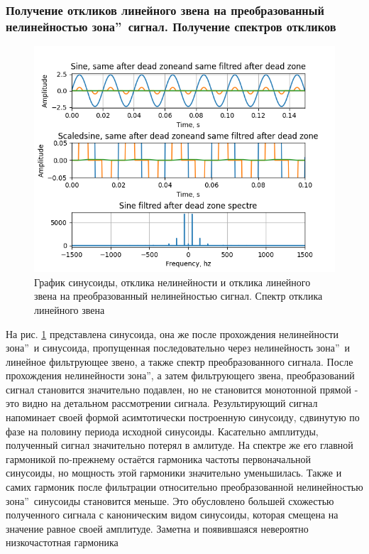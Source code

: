 \subsubsection{Получение откликов линейного звена на преобразованный
нелинейностью  зона\textquotedblright\ сигнал.
Получение спектров откликов}

\begin{figure}[H]
	\centering
	\includegraphics[width=0.95\linewidth]{body/images/sine-after-filtred-dead-zone-and-its-spectre.png}
	\caption{График синусоиды, отклика нелинейности и отклика линейного звена на преобразованный
	нелинейностью сигнал. Спектр отклика линейного звена}
	\label{fig:25}
\end{figure}

На рис. \ref{fig:25} представлена синусоида, она же после прохождения
нелинейности  зона\textquotedblright\ и синусоида,
пропущенная последовательно через нелинейность  зона\textquotedblright\
и линейное фильтрующее звено, а также спектр преобразованного сигнала.
После прохождения нелинейности \textquotedblleftМёртвая зона\textquotedblright, а
затем фильтрующего звена, преобразований сигнал становится значительно подавлен,
но не становится монотонной прямой - это видно на детальном рассмотрении сигнала.
Результирующий сигнал напоминает своей формой асимтотически построенную синусоиду,
сдвинутую по фазе на половину периода исходной синусоиды. Касательно амплитуды,
полученный сигнал значительно потерял в амлитуде. На спектре же его главной
гармоникой по-прежнему остаётся гармоника частоты первоначальной синусоиды,
но мощность этой гармоники значительно уменьшилась. Также и самих гармоник
после фильтрации относительно преобразованной нелинейностью
 зона\textquotedblright\ синусоиды становится
меньше. Это обусловлено большей схожестью полученного сигнала с каноническим
видом синусоиды, которая смещена на значение равное своей амплитуде.
Заметна и появившаяся невероятно низкочастотная гармоника

